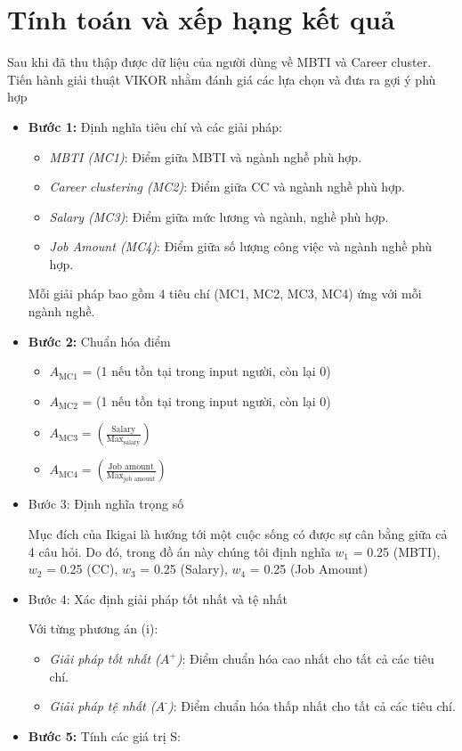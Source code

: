 \section{Tính toán và xếp hạng kết quả}
Sau khi đã thu thập được dữ liệu của người dùng về MBTI và Career cluster. Tiến hành giải thuật VIKOR nhằm đánh giá các lựa chọn và đưa ra gợi ý phù hợp \cite{prasenjit} \cite{qianglin}

\begin{itemize}
    \item \textbf{Bước 1:} Định nghĩa tiêu chí và các giải pháp:
        \begin{itemize}
            \item \textit{MBTI (MC1)}: Điểm giữa MBTI và ngành nghề phù hợp.
            \item \textit{Career clustering (MC2)}: Điểm giữa CC và ngành nghề phù hợp.
            \item \textit{Salary (MC3)}: Điểm giữa mức lương và ngành, nghề phù hợp.
            \item \textit{Job Amount (MC4)}: Điểm giữa số lượng công việc và ngành nghề phù hợp.
        \end{itemize}
        Mỗi giải pháp bao gồm 4 tiêu chí (MC1, MC2, MC3, MC4) ứng với mỗi ngành nghề.
    \item \textbf{Bước 2:} Chuẩn hóa điểm
        \begin{itemize}
            \item $A_{\text{MC1}}$ = (1 nếu tồn tại trong input người, còn lại 0)
            \item $A_{\text{MC2}}$ = (1 nếu tồn tại trong input người, còn lại 0)
            \item $A_{\text{MC3}} = \left(\frac{\text{Salary}}{\text{Max}_{\text{salary}}}\right)$
            \item $A_{\text{MC4}} = \left(\frac{\text{Job amount}}{\text{Max}_{\text{job amount}}}\right)$
        \end{itemize}
    \item Bước 3: Định nghĩa trọng số
    
    Mục đích của Ikigai là hướng tới một cuộc sống có được sự cân bằng giữa cả 4 câu hỏi. Do đó, trong đồ án này chúng tôi định nghĩa 
    $w_{\text{1}}$ = 0.25 (MBTI), $w_{\text{2}}$ = 0.25 (CC), $w_{\text{3}}$ = 0.25 (Salary), $w_{\text{4}}$ = 0.25 (Job Amount)
    \item Bước 4: Xác định giải pháp tốt nhất và tệ nhất
    
    Với từng phương án (i):
        \begin{itemize}
            \item \textit{Giải pháp tốt nhất ($A^{\text{+}}$)}: Điểm chuẩn hóa cao nhất cho tất cả các tiêu chí.
            \item \textit{Giải pháp tệ nhất ($A^{\text{-}}$)}: Điểm chuẩn hóa thấp nhất cho tất cả các tiêu chí.
        \end{itemize}
    \item \textbf{Bước 5:} Tính các giá trị S:
    

\end{itemize}
